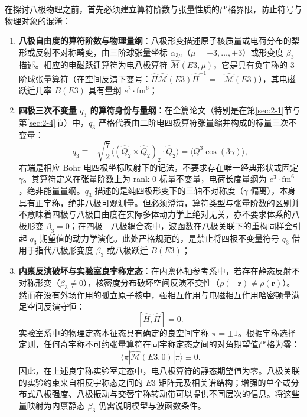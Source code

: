 在探讨八极物理之前，首先必须建立算符阶数与张量性质的严格界限，防止符号与物理对象的混淆：
\begin{enumerate}
\item \textbf{八极自由度的算符阶数与物理量纲}：八极形变描述原子核质量或电荷分布的梨形或反射不对称畸变，由三阶球张量坐标 $\alpha_{3\mu}$（$\mu = -3, \dots, +3$）或形变度 $\beta_3$ 描述。相应的电磁跃迁算符为电八极算符 $\hat{\mathcal{M}}(E3, \mu)$，它是具有负宇称的 3 阶球张量算符（在空间反演下变号：$\hat{\Pi} \hat{\mathcal{M}}(E3) \hat{\Pi}^{-1} = -\hat{\mathcal{M}}(E3)$），其电磁跃迁几率 $B(E3)$ 具有量纲 $e^2\cdot\mathrm{fm}^6$；
\item \textbf{四极三次不变量 $q_3$ 的算符身份与量纲}：在全篇论文（特别是在第\ref{sec:2-1}节与第\ref{sec:2-4}节）中，$q_3$ 严格代表由二阶电四极算符张量缩并构成的标量三次不变量：
\begin{equation}\label{eq:3-7-q3-def}
q_3 \equiv -\sqrt{\frac{7}{2}} \langle (\hat{Q}_2 \times \hat{Q}_2)_2 \cdot \hat{Q}_2 \rangle = \langle Q^3 \cos(3\gamma) \rangle,
\end{equation}
右端是相应 Bohr 电四极坐标映射下的记法，不要求存在唯一经典形状或固定 $\gamma$。其算符定义在张量阶数上为 rank-0 标量不变量，电荷长度量纲为 $e^3\cdot\mathrm{fm}^6$，绝非能量量纲。$q_3$ 描述的是纯四极形变下的三轴不对称度（$\gamma$ 偏离），本身具有正宇称，绝非八极可观测量。但必须澄清，算符类型与张量阶数的区别并不意味着四极与八极自由度在实际多体动力学上绝对无关，亦不要求体系的八极形变 $\beta_3 = 0$；在四极—八极耦合态中，波函数在八极关联下的重构同样会引起 $q_3$ 期望值的动力学演化。此处严格规范的，是禁止将四极不变量符号 $q_3$ 借用于指代八极形变度 $\beta_3$ 或八极跃迁 $B(E3)$；
\item \textbf{内禀反演破坏与实验室良宇称定态}：在内禀体轴参考系中，若存在静态反射不对称形变（$\beta_3 \ne 0$），核密度分布破坏空间反演不变性（$\rho(-\mathbf{r}) \ne \rho(\mathbf{r})$）。然而在没有外场作用的孤立原子核中，强相互作用与电磁相互作用哈密顿量满足空间反演守恒：
\begin{equation}\label{eq:3-7-H-parity-commute}
[\hat{H}, \hat{\Pi}] = 0.
\end{equation}
实验室系中的物理定态本征态具有确定的良空间宇称 $\pi = \pm 1$。根据宇称选择定则，任何奇宇称不可约张量算符在同宇称定态之间的对角期望值严格为零：
\begin{equation}\label{eq:3-7-E3-diag-zero}
\langle \pi | \hat{\mathcal{M}}(E3, 0) | \pi \rangle \equiv 0.
\end{equation}
因此，在上述良宇称实验室定态中，电八极算符的静态期望值为零。八极关联的实验约束来自相反宇称态之间的 $E3$ 矩阵元及相关谱结构；增强的单个或分布式八极强度、八极振动与交替宇称转动带可以提供不同层次的信息。将这些量映射为内禀静态 $\beta_3$ 仍需说明模型与波函数条件。
\end{enumerate}

